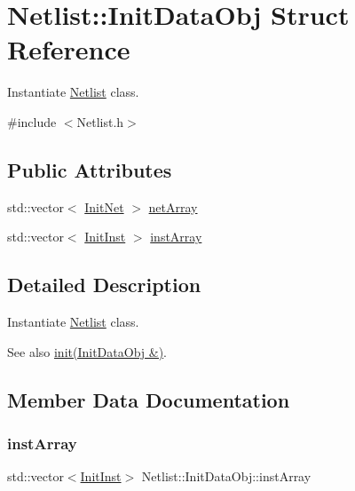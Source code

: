 \hypertarget{structNetlist_1_1InitDataObj}{}\section{Netlist\+:\+:Init\+Data\+Obj Struct Reference}
\label{structNetlist_1_1InitDataObj}


Instantiate \hyperlink{classNetlist}{Netlist} class.  




{\ttfamily \#include $<$Netlist.\+h$>$}

\subsection*{Public Attributes}
\begin{DoxyCompactItemize}
\item 
std\+::vector$<$ \hyperlink{structNetlist_1_1InitNet}{Init\+Net} $>$ \hyperlink{structNetlist_1_1InitDataObj_a6da3cc62735730affa77954952d1f217}{net\+Array}
\item 
std\+::vector$<$ \hyperlink{structNetlist_1_1InitInst}{Init\+Inst} $>$ \hyperlink{structNetlist_1_1InitDataObj_af268c80f194c76f372f8e1dbaed071e0}{inst\+Array}
\end{DoxyCompactItemize}


\subsection{Detailed Description}
Instantiate \hyperlink{classNetlist}{Netlist} class. 

\begin{DoxySeeAlso}{See also}
\hyperlink{classNetlist_ab61cbc31bee838b90f29c52aaae1e52a}{init(\+Init\+Data\+Obj \&)}. 
\end{DoxySeeAlso}


\subsection{Member Data Documentation}
\mbox{\label{structNetlist_1_1InitDataObj_af268c80f194c76f372f8e1dbaed071e0}} 
\subsubsection{\texorpdfstring{inst\+Array}{instArray}}
{\footnotesize\ttfamily std\+::vector$<$\hyperlink{structNetlist_1_1InitInst}{Init\+Inst}$>$ Netlist\+::\+Init\+Data\+Obj\+::inst\+Array}

